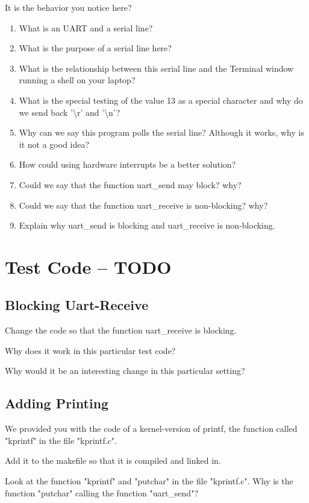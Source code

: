 \documentclass[10]{article}
\begin{document}
It is the behavior you notice here? 

\begin{enumerate}
\item
  What is an UART and a serial line? 
\item
  What is the purpose of a serial line here?
\item
  What is the relationship between this serial line
  and the Terminal window running a shell on your laptop?
\item
  What is the special testing of the value 13 as a special
  character and why do we send back '\textbackslash r' and '\textbackslash n'?
\item
  Why can we say this program polls the serial line?
  Although it works, why is it not a good idea?
\item
  How could using hardware interrupts be a better solution?
\item
  Could we say that the function uart\_send may block? why?
\item
  Could we say that the function uart\_receive is non-blocking? why?
\item
  Explain why uart\_send is blocking and uart\_receive is non-blocking.  
\end{enumerate}

\section{Test Code -- TODO}

\subsection{Blocking Uart-Receive}

Change the code so that the function uart\_receive is blocking.

Why does it work in this particular test code?

Why would it be an interesting change in this particular setting?

\subsection{Adding Printing}

We provided you with the code of a kernel-version of printf,
the function called "kprintf" in the file "kprintf.c".

Add it to the makefile so that it is compiled and linked in.

Look at the function "kprintf" and "putchar" in the file
"kprintf.c". Why is the function "putchar" calling the
function "uart\_send"?
\end{document}
